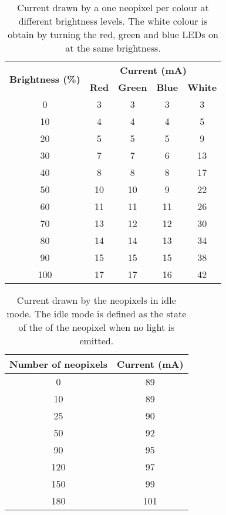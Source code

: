 \begin{table}[h!]
	\centering
	\caption{Current drawn by a one neopixel per colour at different brightness levels. The white colour is obtain by turning the red, green and blue LEDs on at the same brightness.}
	\label{table:current_one_pixel}
	\begin{tabular}{ccccc}
		\hline
		\hline
		\toprule
		\multirow{2}{*}{\textbf{Brightness (\%)}} & \multicolumn{4}{c}{\textbf{Current (mA)}}\\
		& \textbf{Red} & \textbf{Green} & \textbf{Blue} & \textbf{White} \\
		\bottomrule
		\toprule
		0	&	3	&	3	&	3	&	3	\\
		10	&	4	&	4	&	4	&	5	\\
		20	&	5	&	5	&	5	&	9	\\
		30	&	7	&	7	&	6	&	13	\\
		40	&	8	&	8	&	8	&	17	\\
		50	&	10	&	10	&	9	&	22	\\
		60	&	11	&	11	&	11	&	26	\\
		70	&	13	&	12	&	12	&	30	\\
		80	&	14	&	14	&	13	&	34	\\
		90	&	15	&	15	&	15	&	38	\\
		100	&	17	&	17	&	16	&	42	\\
		\bottomrule
		\hline
		\hline
	\end{tabular}
\end{table}

\begin{table}[h!]
	\centering
	\caption{Current drawn by the neopixels in idle mode. The idle mode is defined as the state of the of the neopixel when no light is emitted.}
	\label{table:current_idle}
	\begin{tabular}{cc}
		\hline
		\hline
		\toprule
		\textbf{Number of neopixels} & \textbf{Current (mA)}\\
		\bottomrule
		\toprule
		0	&	89	\\
		10	&	89	\\
		25	&	90	\\
		50	&	92	\\
		90	&	95	\\
		120	&	97	\\
		150	&	99	\\
		180	&	101	\\
		\bottomrule
		\hline
		\hline
	\end{tabular}
\end{table}


